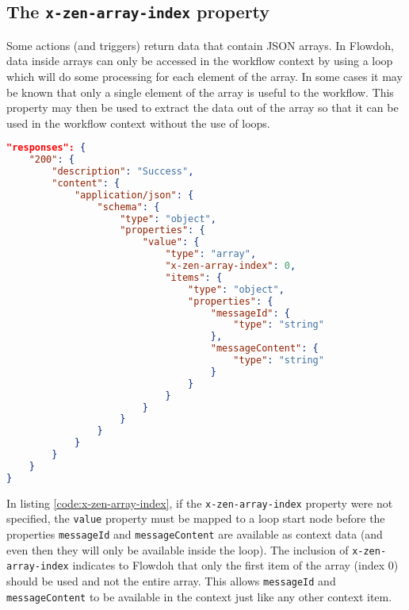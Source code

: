 \subsection{The \texttt{x-zen-array-index} property}
Some actions (and triggers) return data that contain JSON arrays. In Flowdoh, data inside arrays can only be accessed in the workflow context by using a loop which will do some processing for each element of the array. In some cases it may be known that only a single element of the array is useful to the workflow. This property may then be used to extract the data out of the array so that it can be used in the workflow context without the use of loops.\\
\begin{minipage}{\textwidth}
\begin{lstlisting}[caption={\texttt{x-zen-array-index} usage},label={code:x-zen-array-index},language=json]
"responses": {
    "200": {
        "description": "Success",
        "content": {
            "application/json": {
                "schema": {
                    "type": "object",
                    "properties": {
                        "value": {
                            "type": "array",
                            "x-zen-array-index": 0,
                            "items": {
                                "type": "object",
                                "properties": {
                                    "messageId": {
                                        "type": "string"
                                    },
                                    "messageContent": {
                                        "type": "string"
                                    }
                                }
                            }
                        }
                    }
                }
            }
        }
    }
}
\end{lstlisting}
\end{minipage}
In listing \ref{code:x-zen-array-index}, if the \texttt{x-zen-array-index} property were not specified, the \texttt{value} property must be mapped to a loop start node before the properties \texttt{messageId} and \texttt{messageContent} are available as context data (and even then they will only be available inside the loop). The inclusion of \texttt{x-zen-array-index} indicates to Flowdoh that only the first item of the array (index 0) should be used and not the entire array. This allows \texttt{messageId} and \texttt{messageContent} to be available in the context just like any other context item.
